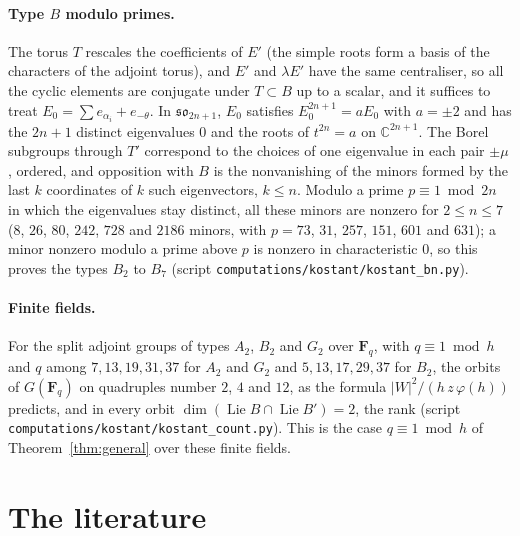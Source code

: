 \documentclass[11pt,a4paper]{amsart}
\theoremstyle{definition}
\theoremstyle{remark}
\newcommand{\C}{\mathbb C}
\begin{document}
\paragraph{Type $B$ modulo primes.} The torus $T$ rescales the coefficients of $E'$ (the simple roots form a basis of the characters of the adjoint torus), and $E'$ and $\lambda E'$ have the same centraliser, so all the cyclic elements are conjugate under $T \subset B$ up to a scalar, and it suffices to treat $E_0 = \sum e_{\alpha_i} + e_{-\theta}$. In $\mathfrak{so}_{2n+1}$, $E_0$ satisfies $E_0^{2n+1} = a E_0$ with $a = \pm 2$ and has the $2n+1$ distinct eigenvalues $0$ and the roots of $t^{2n} = a$ on $\C^{2n+1}$. The Borel subgroups through $T'$ correspond to the choices of one eigenvalue in each pair $\pm\mu$, ordered, and opposition with $B$ is the nonvanishing of the minors formed by the last $k$ coordinates of $k$ such eigenvectors, $k \le n$. Modulo a prime $p \equiv 1 \bmod 2n$ in which the eigenvalues stay distinct, all these minors are nonzero for $2 \le n \le 7$ ($8$, $26$, $80$, $242$, $728$ and $2186$ minors, with $p = 73$, $31$, $257$, $151$, $601$ and $631$); a minor nonzero modulo a prime above $p$ is nonzero in characteristic $0$, so this proves the types $B_2$ to $B_7$ (script \texttt{computations/kostant/kostant\_bn.py}).

\paragraph{Finite fields.} For the split adjoint groups of types $A_2$, $B_2$ and $G_2$ over $\mathbf F_q$, with $q \equiv 1 \bmod h$ and $q$ among $7,13,19,31,37$ for $A_2$ and $G_2$ and $5,13,17,29,37$ for $B_2$, the orbits of $G(\mathbf F_q)$ on quadruples number $2$, $4$ and $12$, as the formula $|W|^2/(h\,z\,\varphi(h))$ predicts, and in every orbit $\dim(\operatorname{Lie}B \cap \operatorname{Lie}B') = 2$, the rank (script \texttt{computations/kostant/kostant\_count.py}). This is the case $q \equiv 1 \bmod h$ of Theorem~\ref{thm:general} over these finite fields.

\section{The literature}\label{sec:literature}
\end{document}
